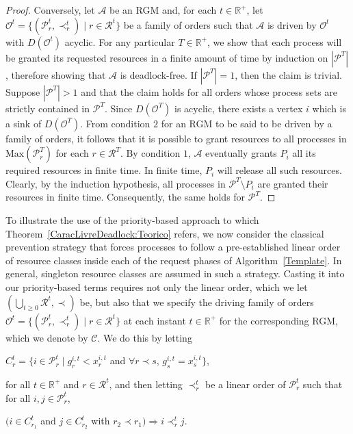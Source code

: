 \documentclass{article}
\newcommand{\Real}{{\mathbb R}}
\newcommand{\st}{\;|\;}
\newcommand{\set}[1][ ]{\{ #1 \}}
\newcommand{\R}{\mathcal{R}}
\begin{document}
\begin{proof}
Conversely, let $\mathcal{A}$ be an RGM and, for each $t \in \Real^+$, let
$\mathcal{O}^t = \set [(\mathcal{P}^t_r, \prec^t_r) \st r \in \mathcal{R}^t]$
be a family of orders such that $\mathcal{A}$ is driven by $\mathcal{O}^t$ with
$D(\mathcal{O}^t)$ acyclic. For any particular $T \in \Real^+$, we show that
each process will be granted its requested resources in a finite amount of time
by induction on $|\mathcal{P}^T|$, therefore showing that $\mathcal{A}$ is
deadlock-free. If $|\mathcal{P}^T| = 1$, then the claim is trivial. Suppose
$|\mathcal{P}^T| > 1$ and that the claim holds for all orders whose process sets
are strictly contained in $\mathcal{P}^T$. Since $D(\mathcal{O}^T)$ is acyclic,
there exists a vertex $i$ which is a sink of $D(\mathcal{O}^T)$. From condition
$2$ for an RGM to be said to be driven by a family of orders, it follows that it
is possible to grant resources to all processes in
$\mathrm{Max}(\mathcal{P}^T_r)$ for each $r \in \mathcal{R}^T$. By condition
$1$, $\mathcal{A}$ eventually grants $P_i$ all its required resources in finite
time. In finite time, $P_i$ will release all such resources. Clearly, by the
induction hypothesis, all processes in $\mathcal{P}^T \setminus P_i$ are granted
their resources in finite time. Consequently, the same holds for
$\mathcal{P}^T$.
\end{proof}

To illustrate the use of the priority-based approach to which
Theorem~\ref{CaracLivreDeadlock:Teorico} refers, we now consider the classical
prevention strategy that forces processes to follow a pre-established linear
order of resource classes inside each of the request phases of
Algorithm~\ref{Template}. In general, singleton resource classes are assumed in
such a strategy. Casting it into our priority-based terms requires not only the
linear order, which we let $(\bigcup_{t \geq 0} \R^t, \prec)$ be, but also that
we specify the driving family of orders
$\mathcal{O}^t = \set [(\mathcal{P}^t_r, \prec^t_r) \st r \in \mathcal{R}^t]$ at
each instant $t \in \Real^+$ for the corresponding RGM, which we denote by
$\mathcal{C}$. We do this by letting
\begin{center}
	$C^t_r = \set[ i \in \mathcal{P}^t_r \st g^{i,t}_r < x^{i,t}_r$ and $\forall r \prec s$, $g^{i,t}_s = x^{i,t}_s ]$,
\end{center}
for all $t \in \Real^+$ and $r \in \mathcal{R}^t$, and then letting
$\prec^t_r$ be a linear order of $\mathcal{P}^t_r$ such that for all
$i, j \in \mathcal{P}^t_r$,
\begin{center}
	$(i \in C^t_{r_1}$ and $j \in C^t_{r_2}$ with $r_2 \prec r_1) \Longrightarrow i \prec^t_r j$.
\end{center}
\end{document}
